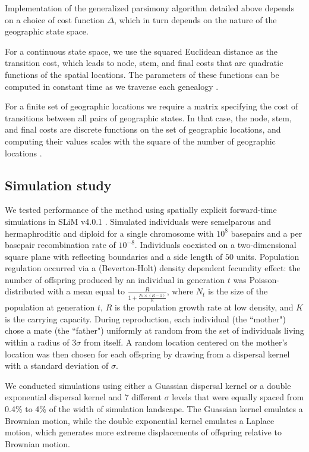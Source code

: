 Implementation of the generalized parsimony algorithm detailed above depends on
a choice of cost function $\Delta$, which in turn depends on the nature of the
geographic state space.

For a continuous state space, we use the squared Euclidean distance as the 
transition cost, which leads to node, stem, and final costs that are quadratic 
functions of the spatial locations. The parameters of these functions can be 
computed in constant time as we traverse each genealogy \citep{Maddison_1991}.

For a finite set of geographic locations we require a matrix specifying the 
cost of transitions between all pairs of geographic states. In that case, the
node, stem, and final costs are discrete functions on the set of geographic
locations, and computing their values scales with the square of the number of
geographic locations \citep{Clemente_etal_2009}.

\subsection{Simulation study}

We tested performance of the method using spatially explicit forward-time 
simulations in SLiM v4.0.1 \citep{Haller_Messer_2023}. Simulated individuals
were semelparous and hermaphroditic and diploid for a single chromosome with 
$10^8$ basepairs and a per basepair recombination rate of $10^{-8}$. Individuals
coexisted on a two-dimensional square plane with reflecting boundaries and a 
side length of $50$ units. Population regulation occurred via a (Beverton-Holt) 
density dependent fecundity effect: the number of offspring produced by an 
individual in generation $t$ was Poisson-distributed with a mean equal to 
$\frac{R}{1 + \frac{N_t \times (R-1)}{K}}$, where $N_t$ is the size of the 
population at generation $t$, $R$ is the population growth rate at low density, 
and $K$ is the carrying capacity. During reproduction, each individual 
(the ``mother") chose a mate (the ``father") uniformly at random from the set 
of individuals living within a radius of $3\sigma$ from itself. A random 
location centered on the mother's location was then chosen for each offspring 
by drawing from a dispersal kernel with a standard deviation of $\sigma$.

We conducted simulations using either a Guassian dispersal kernel or a double
exponential dispersal kernel and 7 different $\sigma$ levels that were equally
spaced from 0.4\% to 4\% of the width of simulation landscape. The Guassian
kernel emulates a Brownian motion, while the double exponential kernel emulates
a Laplace motion, which generates more extreme displacements of offspring
relative to Brownian motion.


